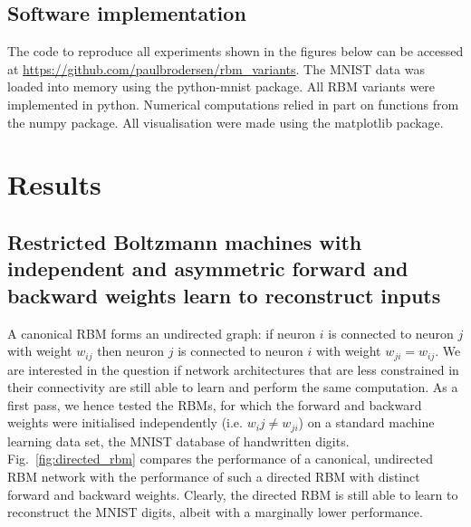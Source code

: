 \documentclass[11pt]{article}
\begin{document}

\subsection{Software implementation}

The code to reproduce all experiments shown in the figures below can
be accessed at \url{https://github.com/paulbrodersen/rbm_variants}. The
MNIST data was loaded into memory using the python-mnist package. All
RBM variants were implemented in python. Numerical computations relied
in part on functions from the numpy package. All visualisation were
made using the matplotlib package.

\section{Results}

\subsection{Restricted Boltzmann machines with independent and asymmetric forward and backward weights learn to reconstruct inputs}

A canonical RBM forms an undirected graph: if neuron $i$ is connected
to neuron $j$ with weight $w_{ij}$ then neuron $j$ is connected to
neuron $i$ with weight $w_{ji} = w_{ij}$. We are interested in the
question if network architectures that are less constrained in their
connectivity are still able to learn and perform the same
computation. As a first pass, we hence tested the RBMs, for which the
forward and backward weights were initialised independently
(i.e. $w_ij \neq w_{ji}$) on a standard machine learning data set, the
MNIST database of handwritten digits. Fig.~\ref{fig:directed_rbm}
compares the performance of a canonical, undirected RBM network with
the performance of such a directed RBM with distinct forward and
backward weights. Clearly, the directed RBM is still able to learn to
reconstruct the MNIST digits, albeit with a marginally lower
performance.
\end{document}
